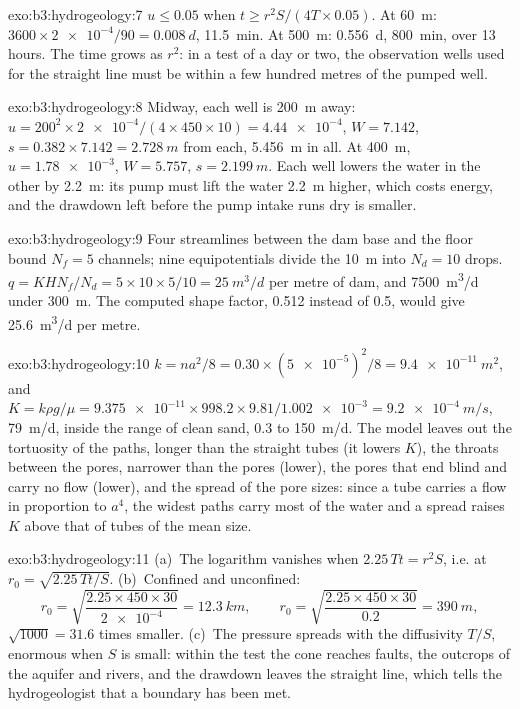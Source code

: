 \begin{solution}{exo:b3:hydrogeology:7}
$u \le 0.05$ when $t \ge r^2S/(4T\times0.05)$. At \qty{60}{m}: $3600\times
\num{2e-4}/90 = \qty{0.008}{d}$, \qty{11.5}{min}. At \qty{500}{m}:
\qty{0.556}{d}, \qty{800}{min}, over 13 hours. The time grows as $r^2$:
in a test of a day or two, the observation wells used for the straight
line must be within a few hundred metres of the pumped well.
\end{solution}

\begin{solution}{exo:b3:hydrogeology:8}
Midway, each well is \qty{200}{m} away: $u = 200^2\times\num{2e-4}/(4
\times450\times10) = \num{4.44e-4}$, $W = \num{7.142}$, $s = 0.382\times
7.142 = \qty{2.728}{m}$ from each, \qty{5.456}{m} in all. At
\qty{400}{m}, $u = \num{1.78e-3}$, $W = \num{5.757}$, $s =
\qty{2.199}{m}$. Each well lowers the water in the other by
\qty{2.2}{m}: its pump must lift the water \qty{2.2}{m} higher, which
costs energy, and the drawdown left before the pump intake runs dry is
smaller.
\end{solution}

\begin{solution}{exo:b3:hydrogeology:9}
Four streamlines between the dam base and the floor bound $N_f = 5$
channels; nine equipotentials divide the \qty{10}{m} into $N_d = 10$
drops. $q = KHN_f/N_d = 5\times10\times5/10 = \qty{25}{m^3/d}$ per metre
of dam, and \qty{7500}{m^3/d} under \qty{300}{m}. The computed shape
factor, 0.512 instead of 0.5, would give \qty{25.6}{m^3/d} per metre.
\end{solution}

\begin{solution}{exo:b3:hydrogeology:10}
$k = na^2/8 = 0.30\times(\num{5e-5})^2/8 = \qty{9.4e-11}{m^2}$, and $K =
k\rho g/\mu = \num{9.375e-11}\times998.2\times9.81/\num{1.002e-3} =
\qty{9.2e-4}{m/s}$, \qty{79}{m/d}, inside the range of clean sand, 0.3 to
\qty{150}{m/d}. The model leaves out the tortuosity of the paths, longer
than the straight tubes (it lowers $K$), the throats between the pores,
narrower than the pores (lower), the pores that end blind and carry no
flow (lower), and the spread of the pore sizes: since a tube carries a
flow in proportion to $a^4$, the widest paths carry most of the water and
a spread raises $K$ above that of tubes of the mean size.
\end{solution}

\begin{solution}{exo:b3:hydrogeology:11}
(a)~The logarithm vanishes when $2.25\,Tt = r^2S$, i.e. at $r_0 =
\sqrt{2.25\,Tt/S}$. (b)~Confined and unconfined:
\[
r_0 = \sqrt{\frac{2.25\times450\times30}{\num{2e-4}}} = \qty{12.3}{km},
\qquad r_0 = \sqrt{\frac{2.25\times450\times30}{0.2}} = \qty{390}{m},
\]
$\sqrt{1000} = 31.6$ times smaller. (c)~The pressure
spreads with the diffusivity $T/S$, enormous when $S$ is small: within
the test the cone reaches faults, the outcrops of the aquifer and rivers,
and the drawdown leaves the straight line, which tells the
hydrogeologist that a boundary has been met.
\end{solution}


